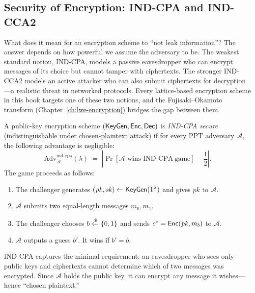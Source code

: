 \subsection{Security of Encryption: IND-CPA and IND-CCA2}
\label{subsec:ind-cpa-cca}

What does it mean for an encryption scheme to ``not leak information''?  The answer depends on how powerful we assume the adversary to be.  The weakest standard notion, IND-CPA, models a passive eavesdropper who can encrypt messages of its choice but cannot tamper with ciphertexts.  The stronger IND-CCA2 models an active attacker who can also submit ciphertexts for decryption---a realistic threat in networked protocols.  Every lattice-based encryption scheme in this book targets one of these two notions, and the Fujisaki--Okamoto transform (Chapter~\ref{ch:lwe-encryption}) bridges the gap between them.

\begin{definition}
\label{def:ind-cpa}
A public-key encryption scheme $(\mathsf{KeyGen}, \mathsf{Enc}, \mathsf{Dec})$ is \emph{IND-CPA secure} (indistinguishable under chosen-plaintext attack) if for every PPT adversary $\mathcal{A}$, the following advantage is negligible:
\begin{equation}
\label{eq:ind-cpa}
\mathrm{Adv}^{\mathrm{ind\text{-}cpa}}_{\mathcal{A}}(\lambda) \;=\; \left| \Pr\!\left[\mathcal{A} \text{ wins } \mathrm{IND\text{-}CPA\ game}\right] - \frac{1}{2} \right|.
\end{equation}
The game proceeds as follows:
\begin{enumerate}
\item The challenger generates $(\mathit{pk}, \mathit{sk}) \gets \mathsf{KeyGen}(1^\lambda)$ and gives $\mathit{pk}$ to $\mathcal{A}$.
\item $\mathcal{A}$ submits two equal-length messages $m_0, m_1$.
\item The challenger chooses $b \getsr \{0,1\}$ and sends $c^* = \mathsf{Enc}(\mathit{pk}, m_b)$ to $\mathcal{A}$.
\item $\mathcal{A}$ outputs a guess $b'$.  It wins if $b' = b$.
\end{enumerate}
\end{definition}

IND-CPA captures the minimal requirement: an eavesdropper who sees only public keys and ciphertexts cannot determine which of two messages was encrypted.  Since $\mathcal{A}$ holds the public key, it can encrypt any message it wishes---hence ``chosen plaintext.''

